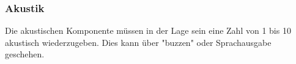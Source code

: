 \documentclass[../..main.tex]{subfiles}
\begin{document}
\subsubsection{Akustik}
Die akustischen Komponente müssen in der Lage sein eine Zahl von 1 bis 10 akustisch wiederzugeben. Dies kann über "buzzen" oder Sprachausgabe geschehen.
\end{document}
